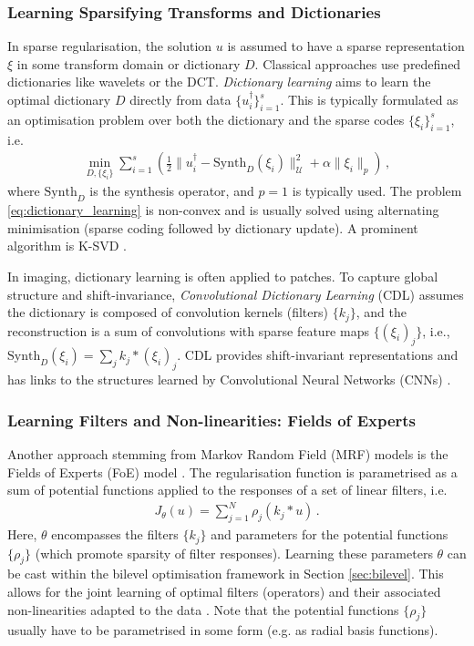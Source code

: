 \subsubsection{Learning Sparsifying Transforms and Dictionaries}\label{sec:dict_learning}
In sparse regularisation, the solution $u$ is assumed to have a sparse representation $\xi$ in some transform domain or dictionary $D$. Classical approaches use predefined dictionaries like wavelets or the DCT. \emph{Dictionary learning} aims to learn the optimal dictionary $D$ directly from data $\{u_i^\dagger\}_{i=1}^s$. This is typically formulated as an optimisation problem over both the dictionary and the sparse codes $\{\xi_i\}_{i=1}^s$, i.e.
\begin{align}
    \min_{D, \{\xi_i\}} \sum_{i=1}^s \left( \frac{1}{2} \|u_i^\dagger - \text{Synth}_{D}(\xi_i)\|_{\mathcal{U}}^2 + \alpha \|\xi_i\|_p \right) \, , \label{eq:dictionary_learning}
\end{align}
where $\text{Synth}_{D}$ is the synthesis operator, and $p=1$ is typically used. The problem \eqref{eq:dictionary_learning} is non-convex and is usually solved using alternating minimisation (sparse coding followed by dictionary update). A prominent algorithm is K-SVD \cite{aharon2006dictionary}.

In imaging, dictionary learning is often applied to patches. To capture global structure and shift-invariance, \emph{Convolutional Dictionary Learning} (CDL) assumes the dictionary is composed of convolution kernels (filters) $\{k_j\}$, and the reconstruction is a sum of convolutions with sparse feature maps $\{(\xi_i)_j\}$, i.e., $\text{Synth}_{D}(\xi_i) = \sum_j k_j * (\xi_i)_j$. CDL provides shift-invariant representations and has links to the structures learned by Convolutional Neural Networks (CNNs) \cite{papyan2017convolutional}.

\subsubsection{Learning Filters and Non-linearities: Fields of Experts}
Another approach stemming from Markov Random Field (MRF) models is the Fields of Experts (FoE) model \cite{roth2005fields}. The regularisation function is parametrised as a sum of potential functions applied to the responses of a set of linear filters, i.e.
\begin{align}
    J_\theta(u) = \sum_{j=1}^N \rho_j(k_j * u) \, . \label{eq:foe_model}
\end{align}
Here, $\theta$ encompasses the filters $\{k_j\}$ and parameters for the potential functions $\{\rho_j\}$ (which promote sparsity of filter responses). Learning these parameters $\theta$ can be cast within the bilevel optimisation framework in Section \ref{sec:bilevel}. This allows for the joint learning of optimal filters (operators) and their associated non-linearities adapted to the data \cite{chen2014learning}. Note that the potential functions $\{\rho_j\}$ usually have to be parametrised in some form (e.g. as radial basis functions).

